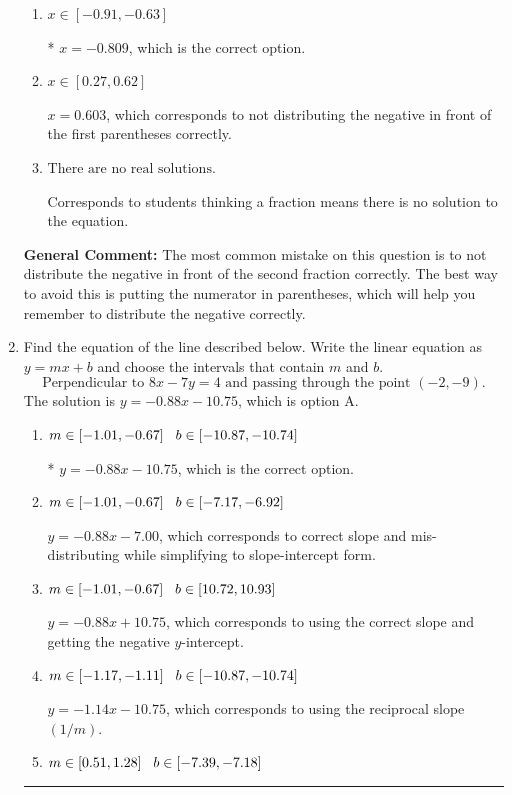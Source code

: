 \documentclass{extbook}[14pt]
\newcommand{\litem}[1]{\item #1

\rule{\textwidth}{0.4pt}}
\begin{document}
\begin{enumerate}
{\begin{enumerate}[label=\Alph*.]
$x = -0.603$, which corresponds to not distributing the negative in front of the second parentheses correctly.
\item \( x \in [-0.91, -0.63] \)

* $x = -0.809$, which is the correct option.
\item \( x \in [0.27, 0.62] \)

$x = 0.603$, which corresponds to not distributing the negative in front of the first parentheses correctly.
\item \( \text{There are no real solutions.} \)

Corresponds to students thinking a fraction means there is no solution to the equation.
\end{enumerate}

\textbf{General Comment:} The most common mistake on this question is to not distribute the negative in front of the second fraction correctly. The best way to avoid this is putting the numerator in parentheses, which will help you remember to distribute the negative correctly.
}
\litem{
Find the equation of the line described below. Write the linear equation as $ y=mx+b $ and choose the intervals that contain $m$ and $b$.
\[ \text{Perpendicular to } 8 x - 7 y = 4 \text{ and passing through the point } (-2, -9). \]The solution is \( y = -0.88x - 10.75 \), which is option A.\begin{enumerate}[label=\Alph*.]
\item \( m \in [-1.01, -0.67] \hspace*{3mm} b \in [-10.87, -10.74] \)

* $y = -0.88x - 10.75$, which is the correct option.
\item \( m \in [-1.01, -0.67] \hspace*{3mm} b \in [-7.17, -6.92] \)

 $y = -0.88x - 7.00$, which corresponds to correct slope and mis-distributing while simplifying to slope-intercept form.
\item \( m \in [-1.01, -0.67] \hspace*{3mm} b \in [10.72, 10.93] \)

 $y = -0.88x + 10.75$, which corresponds to using the correct slope and getting the negative $y$-intercept.
\item \( m \in [-1.17, -1.11] \hspace*{3mm} b \in [-10.87, -10.74] \)

 $y = -1.14x - 10.75$, which corresponds to using the reciprocal slope $(1/m)$.
\item \( m \in [0.51, 1.28] \hspace*{3mm} b \in [-7.39, -7.18] \)


\end{enumerate}}
\end{enumerate}
\end{document}

